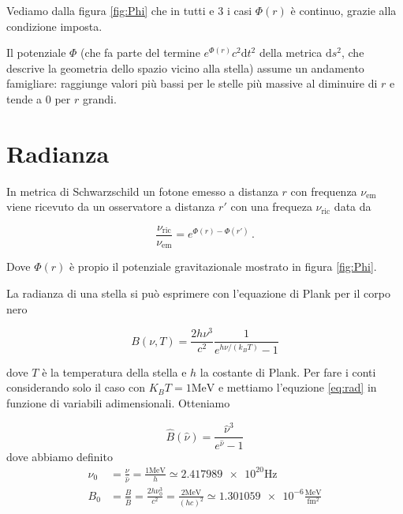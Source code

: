 \documentclass[a4paper, titlepage]{article}
\newcommand{\Sh}[0]{Schwarzschild }
\begin{document}
Vediamo dalla figura \ref{fig:Phi} che in tutti e 3 i casi $\Phi (r)$ è
continuo, grazie alla condizione imposta.

Il potenziale $\Phi$ (che fa parte del termine $e^{\Phi (r)} c^2 \mathrm{d}t^2$
della metrica $\mathrm{d}s^2$, che descrive la geometria dello spazio vicino
alla stella) assume un andamento famigliare: raggiunge valori più bassi per le
stelle più massive al diminuire di $r$ e tende a 0 per $r$ grandi.


\section{Radianza} \label{sec:rad}

In metrica di \Sh un fotone emesso a distanza $r$ con frequenza $\nu_\text{em}$
viene ricevuto da un osservatore a distanza $r'$ con una frequeza
$\nu_\text{ric}$ data da

\begin{equation}
    \frac{\nu_\text{ric}}{\nu_\text{em}} = e^{\Phi (r) - \Phi (r')} \, .
\label{eq:redshift}
\end{equation}

Dove $\Phi (r)$ è propio il potenziale gravitazionale mostrato in figura
\ref{fig:Phi}.

La radianza di una stella si può esprimere con l'equazione di Plank per il corpo
nero

\begin{equation}
    B(\nu, T) = \frac{2 h \nu ^3}{c^2} \frac{1}{e^{h \nu / (k_B T)} - 1}
    \label{eq:rad}
\end{equation}

dove $T$ è la temperatura della stella e $h$ la costante di Plank.
Per fare i conti considerando solo il caso con $K_B T = 1
\unit{\mega\electronvolt}$ e mettiamo l'equzione \ref{eq:rad} in funzione di
variabili adimensionali. Otteniamo

\begin{equation}
    \hat B(\hat \nu) = \frac{\hat \nu ^3 }{e^{\hat \nu} - 1}
    \label{eq:B_ad}
\end{equation}
dove abbiamo definito
\begin{align}
    \nu_0 &= \frac{\nu}{\hat \nu} = \frac{1\unit{\mega\electronvolt}}{h} \simeq
    \num{2.417989e20} \unit{\hertz} \label{eq:B0def}\\
    B_0 &= \frac{B}{\hat B} = \frac{2 h \nu_0^3}{c^2}
    = \frac{2 \unit{\mega\electronvolt}}{(h c)^2} \simeq \num{1.301059e-6}
    \frac{\unit{\mega\electronvolt}}{\unit{\femto\meter\squared}}
    \label{eq:nu0def}
\end{align}
\end{document}
